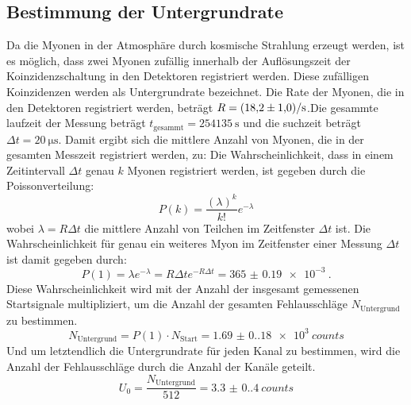 \subsection{Bestimmung der Untergrundrate}
Da die Myonen in der Atmosphäre durch kosmische Strahlung erzeugt werden, ist es möglich, dass zwei Myonen zufällig innerhalb der Auflösungszeit der Koinzidenzschaltung in den Detektoren registriert werden. Diese zufälligen Koinzidenzen werden als Untergrundrate bezeichnet. Die Rate der Myonen, die in den Detektoren registriert werden, beträgt $R = \qty{18.2+-1.0}{\per\second}$.Die gesammte laufzeit der Messung beträgt $t_\text{gesammt} = \qty{254135}{\second}$ und die suchzeit beträgt $\Delta t = \qty{20}{\micro\second}$. Damit ergibt sich die mittlere Anzahl von Myonen, die in der gesamten Messzeit registriert werden, zu:
Die Wahrscheinlichkeit, dass in einem Zeitintervall $\Delta t$ genau $k$ Myonen registriert werden, ist gegeben durch die Poissonverteilung:
\begin{equation}
    P(k) = \frac{(\lambda)^k}{k!} e^{-\lambda}
\end{equation}
wobei $\lambda = R \Delta t$ die mittlere Anzahl von Teilchen im Zeitfenster $\Delta t$ ist. Die Wahrscheinlichkeit für genau ein weiteres Myon im Zeitfenster einer Messung $\Delta t$ ist damit gegeben durch:
\begin{equation}
    P(1) = \lambda e^{-\lambda} = R \Delta t e^{-R \Delta t} = \qty{365(0.19)e-3}{}.
\end{equation}
Diese Wahrscheinlichkeit wird mit der Anzahl der insgesamt gemessenen Startsignale multipliziert, um die Anzahl der gesamten Fehlausschläge $N_\text{Untergrund}$ zu bestimmen.
\begin{equation}
    N_\text{Untergrund} = P(1) \cdot N_\text{Start} = \qty{1.69(0.18)e3}{counts}
\end{equation}
Und um letztendlich die Untergrundrate für jeden Kanal zu bestimmen, wird die Anzahl der Fehlausschläge durch die Anzahl der Kanäle geteilt.
\begin{equation}
    U_0 = \frac{N_\text{Untergrund}}{512} = \qty{3.3(0.4)}{counts}
\end{equation}


